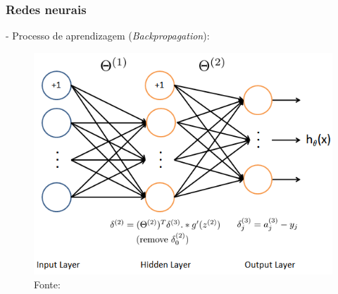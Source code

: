 \documentclass[10pt]{beamer}
\begin{document}
\begin{frame}[fragile]
  \frametitle{Redes neurais}

  - Processo de aprendizagem (\textit{Backpropagation}):

  \begin{figure}
    \begin{center}
      \includegraphics[scale=0.42]{img/backpropagationalg}
    \end{center}
    \caption{Fonte: }
  \end{figure}
  
\end{frame}
\end{document}
